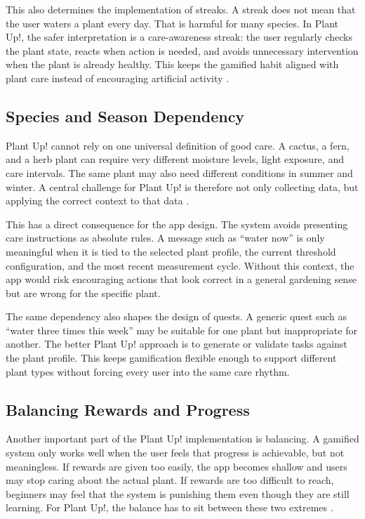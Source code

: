 This also determines the implementation of streaks. A streak does not mean that the user waters a plant every day. That is harmful for many species. In Plant Up!, the safer interpretation is a care-awareness streak: the user regularly checks the plant state, reacts when action is needed, and avoids unnecessary intervention when the plant is already healthy. This keeps the gamified habit aligned with plant care instead of encouraging artificial activity \cite{usuOverwatering,rootRotsWisc}.

\subsection{Species and Season Dependency}

Plant Up! cannot rely on one universal definition of good care. A cactus, a fern, and a herb plant can require very different moisture levels, light exposure, and care intervals. The same plant may also need different conditions in summer and winter. A central challenge for Plant Up! is therefore not only collecting data, but applying the correct context to that data \cite{ncStateSoils,lsuWaterWisely,unhHumidity}.

This has a direct consequence for the app design. The system avoids presenting care instructions as absolute rules. A message such as ``water now'' is only meaningful when it is tied to the selected plant profile, the current threshold configuration, and the most recent measurement cycle. Without this context, the app would risk encouraging actions that look correct in a general gardening sense but are wrong for the specific plant.

The same dependency also shapes the design of quests. A generic quest such as ``water three times this week'' may be suitable for one plant but inappropriate for another. The better Plant Up! approach is to generate or validate tasks against the plant profile. This keeps gamification flexible enough to support different plant types without forcing every user into the same care rhythm.

\subsection{Balancing Rewards and Progress}

Another important part of the Plant Up! implementation is balancing.
 A gamified system only works well when the user feels that progress is achievable, but not meaningless. 
 If rewards are given too easily, the app becomes shallow and users may stop caring about the actual plant.
  If rewards are too difficult to reach, beginners may feel that the system is punishing them even though they are still learning.
   For Plant Up!, the balance has to sit between these two extremes \cite{gamifyMotivation,chouGamification2015}.

